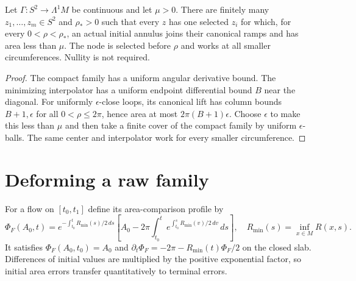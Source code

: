 \begin{lemma}
\label{lem:annular-finite-net}
Let $\Gamma:S^2\to\Lambda^1M$ be continuous and let $\mu>0$.
There are finitely many $z_1,\ldots,z_m\in S^2$ and $\rho_*>0$
such that every $z$ has one selected $z_i$ for which, for every
$0<\rho<\rho_*$, an actual initial annulus joins their canonical
ramps and has area less than $\mu$. The node is selected before
$\rho$ and works at all smaller circumferences. Nullity is not required.
\end{lemma}
\begin{proof}
The compact family has a uniform angular derivative bound.
The minimizing interpolator has a uniform endpoint differential
bound $B$ near the diagonal. For uniformly $\epsilon$-close loops,
its canonical lift has column bounds $B+1,\epsilon$ for all
$0<\rho\leq2\pi$, hence area at most $2\pi(B+1)\epsilon$.
Choose $\epsilon$ to make this less than $\mu$ and then take a finite
cover of the compact family by uniform $\epsilon$-balls. The same
center and interpolator work for every smaller circumference.
\end{proof}

\section{Deforming a raw family}
\label{sec:width-deformation}

For a flow on $[t_0,t_1]$ define its area-comparison profile by
\begin{equation}
 \Phi_F(A_0,t)=e^{-\int_{t_0}^{t}R_{\min}(s)/2\,ds}
 \left[A_0-2\pi\int_{t_0}^{t}
 e^{\int_{t_0}^{s}R_{\min}(v)/2\,dv}\,ds\right],
 \quad R_{\min}(s)=\inf_{x\in M}R(x,s).
 \label{eq:comparison-profile}
\end{equation}
It satisfies $\Phi_F(A_0,t_0)=A_0$ and
$\partial_t\Phi_F=-2\pi-R_{\min}(t)\Phi_F/2$ on the closed slab.
Differences of initial values are multiplied by the positive exponential
factor, so initial area errors transfer quantitatively to terminal errors.

